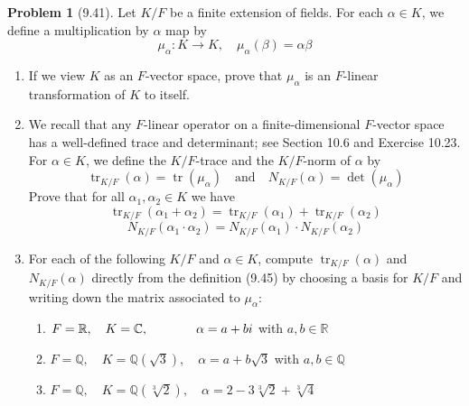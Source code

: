\documentclass[12pt]{article}
\theoremstyle{definition}
\newtheorem{problem}{Problem}
\DeclareMathOperator{\tr}{tr}
\begin{document}
\begin{problem}[9.41]
    Let $K/F$ be a finite extension of fields. For each $\alpha \in K$, we define a multiplication by $\alpha$ map by
    \[
        \mu_\alpha : K \longrightarrow K, \quad \mu_\alpha(\beta) = \alpha\beta
    \]
    \begin{enumerate}[label=(\alph*)]
        \item If we view $K$ as an $F$-vector space, prove that $\mu_\alpha$ is an $F$-linear transformation of $K$ to itself.
        \begin{solution}

        \end{solution}

        \item We recall that any $F$-linear operator on a finite-dimensional $F$-vector space has a well-defined
              trace and determinant; see Section 10.6 and Exercise 10.23. For $\alpha \in K$, we define the $K/F$-trace
              and the $K/F$-norm of $\alpha$ by
              \[
                  \tr_{K/F}(\alpha) = \tr(\mu_\alpha) \quad \text{and} \quad N_{K/F}(\alpha) = \det(\mu_\alpha)
              \]
              Prove that for all $\alpha_1, \alpha_2 \in K$ we have
              \[
                    \tr_{K/F}(\alpha_1 + \alpha_2) = \tr_{K/F}(\alpha_1) + \tr_{K/F}(\alpha_2)
              \]
              \[
                    N_{K/F}(\alpha_1 \cdot \alpha_2) = N_{K/F}(\alpha_1) \cdot N_{K/F}(\alpha_2)
              \]
        \begin{solution}

        \end{solution}

        \item For each of the following $K/F$ and $\alpha \in K$, compute $\tr_{K/F}(\alpha)$ and $N_{K/F}(\alpha)$
              directly from the definition (9.45) by choosing a basis for $K/F$ and writing down the matrix associated to $\mu_\alpha$:
              \begin{enumerate}[label=(\arabic*)]
                \item $F = \mathbb{R}, \quad K = \mathbb{C},              \hspace{38px} \alpha = a + bi$ with $a,b \in \mathbb{R}$
                \item $F = \mathbb{Q}, \quad K = \mathbb{Q}(\sqrt{3}),    \quad \alpha = a + b\sqrt{3}$ with $a,b \in \mathbb{Q}$ 
                \item $F = \mathbb{Q}, \quad K = \mathbb{Q}(\sqrt[3]{2}), \quad \alpha = 2 - 3\sqrt[3]{2} + \sqrt[3]{4}$ 
              \end{enumerate}
        \begin{solution}


\end{solution}
\end{enumerate}
\end{problem}
\end{document}
